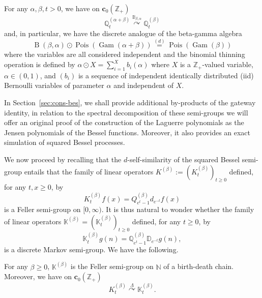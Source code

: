 \documentclass[AHL,Unicode,longabstracts]{cedram}
\DeclareMathOperator{\Pois}{Pois}
\DeclareMathOperator{\Gam}{Gam}
\DeclareMathOperator{\rmB}{B}
\newcommand{\df}{\mathrel{:=}}
\newcommand{\ZZ}{\mathbb{Z}}
\newcommand{\esc}{\mathbf{c}}
\newcommand*\N{{\mathbb N}}
\newcommand{\discret}[1]{\mathds{#1}}
\newcommand{\cont}[1]{{#1}}
\newcommand{\Gate}[3]{#1\stackrel{#2}{\curvearrowright}#3}
\begin{document}
\begin{prop}\label{prop:beta-gam-d}
For any $\alpha,\beta,t>0$, we have on $\esc_0(\ZZ_+)$
\begin{equation}\label{eq:int-dbeta-gamma}
\Gate{\discret{Q}^{(\alpha+\beta)}_t}{\discret{B}_{\beta,\alpha}}{\discret Q^{(\beta)}_t}
\end{equation}
and, in particular, we have the discrete analogue of the beta-gamma algebra
\[
\rmB({\beta,\alpha}) \odot\Pois(\Gam(\alpha+\beta))\stackrel{(d)}{=}\Pois(\Gam(\beta))
\]
where the variables are all considered independent and the binomial thinning operation is defined by $\alpha \odot X = \sum_{i=1}^{X}b_i(\alpha)$ where $X$ is a $\mathbb{Z}_+$-valued variable, $\alpha \in (0, 1)$, and $(b_i)$ is a sequence of independent identically distributed (iid) Bernoulli variables of parameter $\alpha$ and independent of $X$.
\end{prop}

In Section~\ref{sec:cons-bes}, we shall provide additional by-products of the gateway identity, in relation to the spectral decomposition of these semi-groups we will offer an original proof of the construction of the Laguerre polynomials as the Jensen polynomials of the Bessel functions. Moreover, it also provides an exact simulation of squared Bessel processes.

We now proceed by recalling that the $\cont{d}$-self-similarity of the squared Bessel semi-group entails that the family of linear operators $\cont{K}^{(\beta)}\df(\cont{K}^{(\beta)}_t)_{t\geq 0}$ defined, for any $t,x\geq 0$, by
\begin{equation*}
\cont{K}^{(\beta)}_t f(x) = \cont{Q}^{(\beta)}_{e^t-1} \cont{d}_{e^{-t}}f(x)
\end{equation*}
is a Feller semi-group on $[0,\infty)$. It is thus natural to wonder whether the family of linear operators $\discret{K}^{(\beta)}=(\discret{K}^{(\beta)}_t)_{t\geq 0}$ defined, for any $t\geq 0$, by
\begin{equation*}
\discret{K}^{(\beta)}_t g(n) = \discret{Q}^{(\beta)}_{e^t-1} \discret{D}_{e^{-t}}g(n),
\end{equation*}
is a discrete Markov semi-group. We have the following.

\begin{theo}\label{thm:mainK}
For any $\beta\geq 0$, $\discret{K}^{(\beta)}$ is the Feller semi-group on $\N$ of a birth-death chain. Moreover, we have on $\esc_0(\ZZ_+)$
\begin{equation}\label{eq:gateway-lag}
\Gate{\cont{K}_t^{(\beta)}}{\Lambda}{\discret{K}_t^{(\beta)}}.
\end{equation}
\end{theo}
\end{document}
